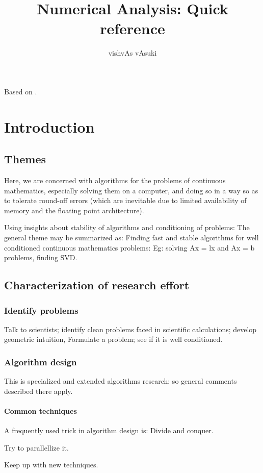 \documentclass[oneside, article]{memoir}
\title{Numerical Analysis: Quick reference}
\author{vishvAs vAsuki}
\begin{document}
\maketitle

\tableofcontents

Based on \cite{trefBau}.

\part{Introduction}
\chapter{Themes}
Here, we are concerned with algorithms for the problems of continuous mathematics, especially solving them on a computer, and doing so in a way so as to tolerate round-off errors (which are inevitable due to limited availability of memory and the floating point architecture).

Using insights about stability of algorithms and conditioning of problems: The general theme may be summarized as: Finding fast and stable algorithms for well conditioned continuous mathematics problems: Eg: solving Ax = lx and Ax = b problems, finding SVD.

\chapter{Characterization of research effort}
\section{Identify problems}
Talk to scientists; identify clean problems faced in scientific calculations; develop geometric intuition, Formulate a problem; see if it is well conditioned.

\section{Algorithm design}
This is specialized and extended algorithms research: so general comments described there apply.

\subsection{Common techniques}
A frequently used trick in algorithm design is: Divide and conquer. 

Try to parallellize it.

Keep up with new techniques. 
\end{document}
